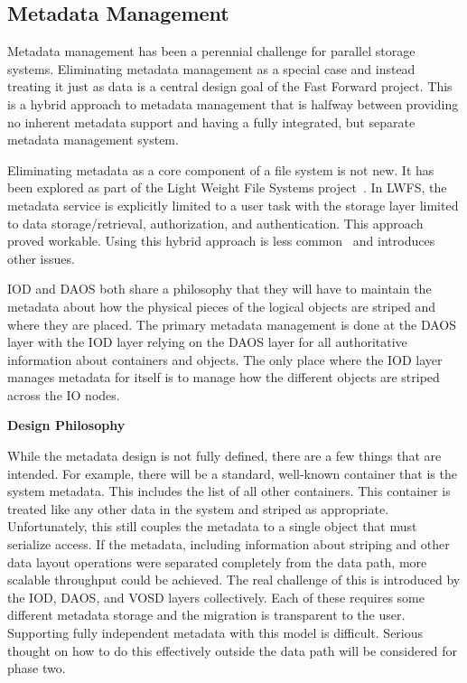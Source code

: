 \documentclass[conference]{IEEEtran}
\begin{document}
\subsection{Metadata Management}
Metadata management has been a perennial challenge for parallel storage
systems.  Eliminating metadata management as a special case and instead
treating it just as data is a central design goal of the Fast Forward project.
This is a hybrid approach to metadata management that is halfway between
providing no inherent metadata support and having a fully integrated, but
separate metadata management system.

Eliminating metadata as a core component of a file system is not new. It has
been explored as part of the Light Weight File Systems
project~\cite{oldfield:lwfs}. In LWFS, the metadata service is explicitly
limited to a user task with the storage layer limited to data
storage/retrieval, authorization, and authentication. This approach proved
workable. Using this hybrid approach is less common~\cite{weil:2006:ceph} and
introduces other issues.

IOD and DAOS both share a philosophy that they will have to maintain the
metadata about how the physical pieces of the logical objects are striped and
where they are placed. The primary metadata management is done at the DAOS
layer with the IOD layer relying on the DAOS layer for all authoritative
information about containers and objects. The only place where the IOD layer
manages metadata for itself is to manage how the different objects are striped
across the IO nodes.

\noindent\textbf{Design Philosophy}

While the metadata design is not fully defined, there are a few things that
are intended. For example, there will be a standard, well-known container that
is the system metadata. This includes the list of all other containers. This
container is treated like any other data in the system and striped as
appropriate. Unfortunately, this still couples the metadata to a single object
that must serialize access. If the metadata, including information about
striping and other data layout operations were separated completely from the
data path, more scalable throughput could be achieved. The real challenge of
this is introduced by the IOD, DAOS, and VOSD layers collectively. Each of
these requires some different metadata storage and the migration is transparent
to the user.  Supporting fully independent metadata with this model is
difficult. Serious thought on how to do this effectively outside the data path
will be considered for phase two.
\end{document}
